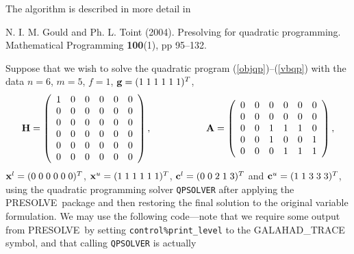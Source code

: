 \documentclass{galahad}
\newcommand{\packagename}{PRESOLVE}
\newcommand{\sym}{\sf\small}
\begin{document}
\vspace*{1mm}

\galreferences
\vspace*{1mm}

\noindent
The algorithm is described in more detail in
\vspace*{1mm}

\noindent
N. I. M. Gould and Ph. L. Toint (2004).
Presolving for quadratic programming.
Mathematical Programming {\bf 100}(1), pp 95--132.
\vspace*{1mm}



\galexample
Suppose that we wish to solve the quadratic program
(\ref{objqp})--(\ref{vbqp}) with the data $n = 6$, $m = 5$, $f = 1$, 
${\mathbf{g}} = ( 1 \; 1 \; 1 \; 1 \; 1 \; 1)^T$,
\[
{\mathbf{H}} =\left(\begin{array}{cccccc}
        1 & 0 & 0 & 0 & 0 & 0 \\
        0 & 0 & 0 & 0 & 0 & 0 \\
        0 & 0 & 0 & 0 & 0 & 0 \\
        0 & 0 & 0 & 0 & 0 & 0 \\
        0 & 0 & 0 & 0 & 0 & 0 \\
        0 & 0 & 0 & 0 & 0 & 0 \\
        \end{array}\right),
\hspace*{2cm}
{\mathbf{A}} = \left(\begin{array}{cccccc}
        0 & 0 & 0 & 0 & 0 & 0 \\
        0 & 0 & 0 & 0 & 0 & 0 \\
        0 & 0 & 1 & 1 & 1 & 0 \\
        0 & 0 & 1 & 0 & 0 & 1 \\
        0 & 0 & 0 & 1 & 1 & 1 \\
        \end{array}\right),
\]        
${\mathbf{x}}^l = ( 0\; 0\; 0\; 0\; 0\; 0 )^T$, 
${\mathbf{x}}^u = ( 1 \; 1 \; 1 \; 1 \; 1 \; 1 )^T$, 
${\mathbf{c}}^l = ( 0 \; 0 \; 2 \; 1 \; 3 )^T$ and 
${\mathbf{c}}^u = ( 1 \; 1 \; 3 \; 3 \; 3 )^T$,
using the quadratic programming solver {\tt QPSOLVER} after applying
the \packagename\ package and then restoring the final solution to the original
variable formulation. We may use the following code---note that we require
some output from \packagename\ by setting {\tt control\%print\_level} to the
{\sym GALAHAD\_TRACE} symbol, and that calling {\tt QPSOLVER} is actually
\end{document}
